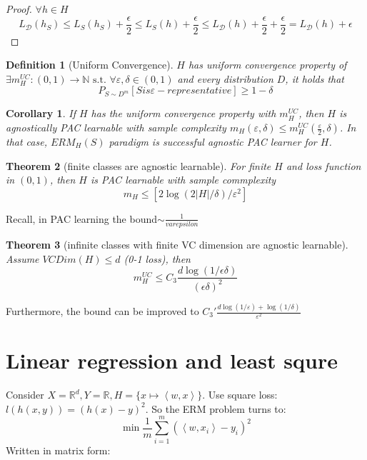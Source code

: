 \documentclass{book}
\newcommand{\R}{\mathbb{R}}
\newcommand{\st}{\text{ s.t. }}
\newcommand{\dual}[1]{\left<#1\right>}
\newtheorem{Thm}{Theorem}[section]
\newtheorem{Cor}[Thm]{Corollary}
\newtheorem{Def}{Definition}[section]
\begin{document}
\begin{proof}
  $\forall h\in H$
  \[L_{\mathcal{D}}\left(h_{S}\right) \leq L_{S}\left(h_{S}\right)+\frac{\epsilon}{2} \leq L_{S}(h)+\frac{\epsilon}{2} \leq L_{\mathcal{D}}(h)+\frac{\epsilon}{2}+\frac{\epsilon}{2}=L_{\mathcal{D}}(h)+\epsilon\]
\end{proof}

\begin{Def}[Uniform Convergence]
  $H$ has uniform convergence property of $\exists m_{H}^{UC}:(0,1)\to\mathbb{N}\st\forall \varepsilon,\delta\in(0,1)$ and every distribution $D$, it holds that 
  \[P_{S\sim D^{m}}[S is \varepsilon-representative]\geq 1-\delta\]
\end{Def}

\begin{Cor}
  If $H$ has the uniform convergence property with $m_{H}^{UC}$, then $H$ is agnostically PAC learnable with sample complexity $m_{H}(\varepsilon,\delta)\leq m_{H}^{UC}(\frac{\varepsilon}{2},\delta)$. In that case, $ERM_{H}(S)$ paradigm is successful agnostic PAC learner for $H$.
\end{Cor}

\begin{Thm}[finite classes are agnostic learnable]
  For finite $H$ and loss function in $(0,1)$, then $H$ is PAC learnable with sample commplexity
  \[m_{H}\leq [2\log(2|H|/\delta)/\varepsilon^{2}]\]
\end{Thm}

Recall, in PAC learning the bound$\sim\frac{1}{varepsilon}$

\begin{Thm}[infinite classes with finite VC dimension are agnostic learnable]
  Assume $VCDim(H)\leq d$ (0-1 loss), then
  \[m_{H}^{UC}\leq C_{3}\frac{d\log(1/\epsilon\delta)}{(\epsilon\delta)^{2}}\]
\end{Thm}

Furthermore, the bound can be improved to $C_{3}'\frac{d\log(1/\varepsilon)+\log(1/\delta)}{\varepsilon^{2}}$


\section{Linear regression and least squre}
Consider $X=\R^{d},Y=\R, H=\{x\mapsto \dual{w,x}\}$. Use square loss: $l(h(x,y))=(h(x)-y)^{2}$. So the ERM problem turns to:
\[ \min\frac{1}{m}\sum_{i=1}^{m} (\dual{w,x_{i}}-y_{i})^{2}\]
Written in matrix form:
\end{document}
